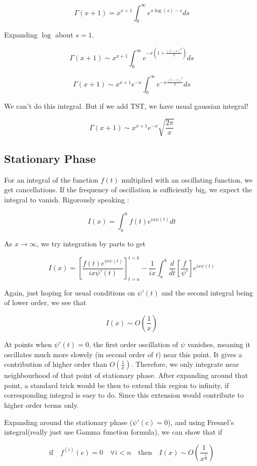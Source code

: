 \documentclass{report}
\begin{document}
$$\Gamma(x+1) = x^{x+1}\int_{0}^{\infty}e^{x\log(s) - s}ds$$

\noindent Expanding $\log$ about $s=1$.

$$\Gamma(x+1) \sim x^{x+1}\int_{0}^{\infty}e^{-x\left(1+\frac{(1-s)^2}{2}\right)}ds$$

$$\Gamma(x+1) \sim x^{x+1}e^{-x}\int_{0}^{\infty}e^{-x\frac{(1-s)^2}{2}}ds$$

\noindent We can't do this integral. But if we add TST, we have usual gaussian integral!

$$\Gamma(x+1) \sim x^{x+1}e^{-x} \sqrt{\frac{2\pi}{x}}$$

\subsection{Stationary Phase}

For an integral of the function $f(t)$ multiplied with an oscillating function, we get cancellations. If the frequency of oscillation is sufficiently big, we expect the integral to vanish. Rigorously speaking :

$$I(x) = \int_{a}^{b}f(t)e^{ix\psi(t)}dt$$

\noindent As $x\to\infty$, we try integration by parts to get


$$I(x) = \left[\frac{f(t)e^{ix\psi(t)}}{ix\psi'(t)}\right]_{t=a}^{t=b} - \frac{1}{ix}\int_{a}^{b}\frac{d}{dt}\left[\frac{f}{\psi'}\right]e^{ix\psi(t)}$$

\noindent Again, just hoping for usual conditions on $\psi'(t)$ and the second integral being of lower order, we see that 

$$I(x) \sim O\left(\frac{1}{x}\right)$$

\noindent At points when $\psi'(t) = 0$, the first order oscillation of $\psi$ vanishes, meaning it oscillates much more slowely (in second order of $t$) near this point. It gives a contribution of higher order than $O(\frac{1}{x})$. Therefore, we only integrate near neighbourhood of that point of stationary phase. After expanding around that point, a standard trick would be then to extend this region to infinity, if corresponding integral is easy to do. Since this extension would contribute to higher order terms only.

\noindent Expanding around the stationary phase ($\psi'(c) =0 $), and using Fresnel's integral(really just use Gamma function formula), we can show that if 

$$\mathrm{if}\quad f^{(i)}(c) = 0 \quad\forall i<n \quad \mathrm{then} \quad  I(x) \sim O\left(\frac{1}{x^{\frac{1}{n}}}\right)$$
\end{document}
